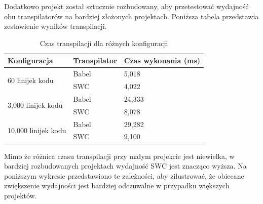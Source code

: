 \documentclass{article}
\begin{document}
Dodatkowo projekt został sztucznie rozbudowany, aby przetestować wydajność obu transpilatorów na bardziej złożonych projektach. Poniższa tabela przedstawia zestawienie wyników transpilacji.

\begin{table}[H]
\centering
\begin{tabular}{|l|l|l|}
\hline
\textbf{Konfiguracja} & \textbf{Transpilator} & \textbf{Czas wykonania (ms)} \\ \hline
\multirow{2}{*}{60 linijek kodu} & Babel & 5,018 \\ 
& SWC & 4,022 \\ \hline
\multirow{2}{*}{3,000 linijek kodu} & Babel & 24,333 \\ 
& SWC & 8,078 \\ \hline
\multirow{2}{*}{10,000 linijek kodu} & Babel & 29,282 \\ 
& SWC & 9,100 \\ \hline
\end{tabular}
\caption{Czas transpilacji dla różnych konfiguracji}
\label{tab:czas_wykonania}
\end{table}

Mimo że różnica czasu transpilacji przy małym projekcie jest niewielka, w bardziej rozbudowanych projektach wydajność SWC jest znacząco wyższa. Na poniższym wykresie przedstawiono te zależności, aby zilustrować, że obiecane zwiększenie wydajności jest bardziej odczuwalne w przypadku większych projektów.

\begin{center}
\end{center} 
\end{document}
